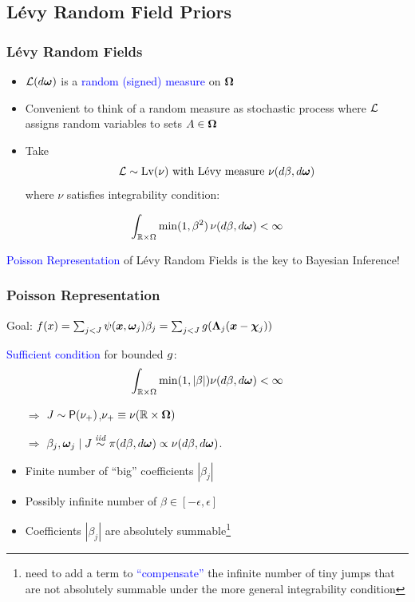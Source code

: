 \documentclass[dvips]{beamer}
\newcommand{\bs}[2]{\begin{frame} \frametitle{#1} 
{#2}
\end{frame} }
\newcommand{\blue}{\textcolor{Blue}}
\begin{document}
\subsection{L\'evy Random Field Priors }

\bs{ L\'evy  Random Fields} {
  \begin{itemize}
  \item 
${\cal L}(d\bm \omega)$  is a \blue{random (signed) measure} on $\bm \Omega$ 

\item Convenient to think of a random measure as stochastic process where
${\cal L}$ assigns random variables  to sets $A \in \bm \Omega$

\item Take
$${\cal L} \sim \mbox{\rm Lv}(\nu) \text{ with L\'evy measure } \nu(d \beta, d
  \bm \omega)$$
where $\nu$ satisfies integrability condition:
\end{itemize}
\begin{equation}
  \label{eq:l2-bound}
\int_{\mathbb{R} \times \Omega} \min(1, \beta^2) \, \nu(d\beta, d
  \bm \omega) < \infty
\end{equation}


\blue{Poisson Representation} of L\'evy Random Fields is the key to
Bayesian Inference!
}

\bs{Poisson Representation}{ 
Goal: $f(x) = \sum_{j < J}  \psi(\bm x, \bm \omega_j) \beta_j = \sum_{j <
  J} g(\bm \Lambda_j(\bm x - \bm \chi_j))$ 

\blue{Sufficient condition} for bounded $g$:
\begin{equation}
  \label{eq:l1-bound}
\int_{\mathbb{R} \times \Omega} \min(1, |\beta|) \nu(d\beta, d
  \bm \omega) < \infty
\end{equation}

\begin{itemize}
\item[$\Rightarrow$] $J \sim \mbox{\sf P}(\nu_+)$,\qquad $\nu_+\equiv
  \nu(\mathbb{R}\times\bm \Omega)$
\item[$\Rightarrow$] $\beta_j,\bm \omega_j \mid J \mathrel{\mathop{\sim}\limits^{\mathit{iid}}} \pi(d\beta, d\bm \omega)
  \propto \nu(d\beta,d\bm \omega)$.
\end{itemize}

\begin{itemize}
  \item Finite number of ``big'' coefficients $|\beta_j|$  
  \item Possibly infinite number of $\beta \in [-\epsilon, \epsilon]$
  \item Coefficients $|\beta_j|$ are absolutely summable\footnote{need to add a term to
\blue{``compensate''} the infinite number of tiny jumps that are not
absolutely summable under the more general integrability condition \Eqn{eq:l2-bound}}

  \end{itemize}
}
\end{document}
